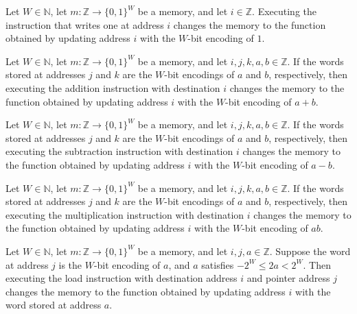 \begin{theorem}
\label{WordRAM.effect_one}
\leanok
{}
Let $W\in\mathbb{N}$, let $m:\mathbb{Z}\to\{0,1\}^W$ be a memory, and let
$i\in\mathbb{Z}$. Executing the instruction that writes one at address $i$ changes the
memory to the function obtained by updating address $i$ with the $W$-bit encoding of
$1$.
\end{theorem}

\begin{theorem}
\label{WordRAM.effect_add}
\leanok
{}
Let $W\in\mathbb{N}$, let $m:\mathbb{Z}\to\{0,1\}^W$ be a memory, and let
$i,j,k,a,b\in\mathbb{Z}$. If the words stored at addresses $j$ and $k$ are the $W$-bit
encodings of $a$ and $b$, respectively, then executing the addition instruction with
destination $i$ changes the memory to the function obtained by updating address $i$ with
the $W$-bit encoding of $a+b$.
\end{theorem}

\begin{theorem}
\label{WordRAM.effect_sub}
\leanok
{}
Let $W\in\mathbb{N}$, let $m:\mathbb{Z}\to\{0,1\}^W$ be a memory, and let
$i,j,k,a,b\in\mathbb{Z}$. If the words stored at addresses $j$ and $k$ are the $W$-bit
encodings of $a$ and $b$, respectively, then executing the subtraction instruction with
destination $i$ changes the memory to the function obtained by updating address $i$ with
the $W$-bit encoding of $a-b$.
\end{theorem}

\begin{theorem}
\label{WordRAM.effect_mul}
\leanok
{}
Let $W\in\mathbb{N}$, let $m:\mathbb{Z}\to\{0,1\}^W$ be a memory, and let
$i,j,k,a,b\in\mathbb{Z}$. If the words stored at addresses $j$ and $k$ are the $W$-bit
encodings of $a$ and $b$, respectively, then executing the multiplication instruction
with destination $i$ changes the memory to the function obtained by updating address $i$
with the $W$-bit encoding of $ab$.
\end{theorem}

\begin{theorem}
\label{WordRAM.effect_load}
\leanok
{}
Let $W\in\mathbb{N}$, let $m:\mathbb{Z}\to\{0,1\}^W$ be a memory, and let
$i,j,a\in\mathbb{Z}$. Suppose the word at address $j$ is the $W$-bit encoding of $a$,
and $a$ satisfies $-2^W\le 2a<2^W$. Then executing the load instruction with destination
address $i$ and pointer address $j$ changes the memory to the function obtained by
updating address $i$ with the word stored at address $a$.
\end{theorem}

